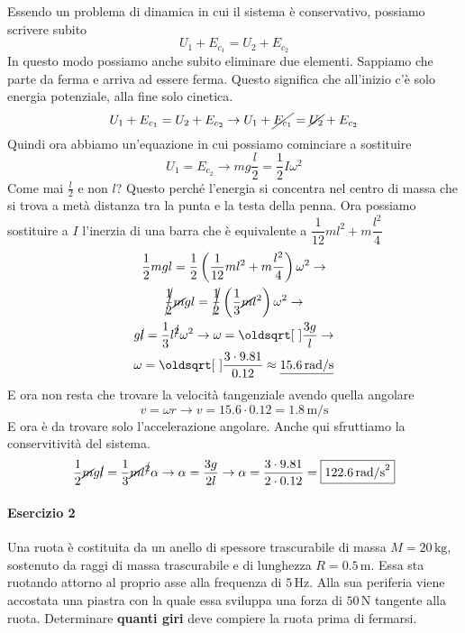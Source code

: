 Essendo un problema di dinamica in cui il sistema è conservativo, possiamo scrivere subito
\begin{equation*}
  U_1 + E_{c_1} = U_2 + E_{c_2}
\end{equation*}
In questo modo possiamo anche subito eliminare due elementi. Sappiamo che parte da ferma e arriva ad
essere ferma. Questo significa che all'inizio c'è solo energia potenziale, alla fine solo cinetica.
\begin{equation*}
  U_1 + E_{c_1} = U_2 + E_{c_2} \rightarrow U_1 + \cancel{E_{c_1}} = \cancel{U_2} + E_{c_2}
\end{equation*}
Quindi ora abbiamo un'equazione in cui possiamo cominciare a sostituire
\begin{equation*}
  U_1 = E_{c_2} \rightarrow mg\frac{l}{2} = \frac{1}{2}I\omega^2
\end{equation*}
Come mai $\frac{l}{2}$ e non $l$? Questo perché l'energia si concentra nel centro di massa che si 
trova a metà distanza tra la punta e la testa della penna. Ora possiamo sostituire a $I$ l'inerzia
di una barra che è equivalente a $\dfrac{1}{12}ml^2 + m\dfrac{l^2}{4}$
\begin{gather*}
  \frac{1}{2}mgl = \frac{1}{2}\left(\frac{1}{12}ml^2 + m\frac{l^2}{4}\right)\omega^2 \rightarrow\\
  \cancel{\frac{1}{2}}\cancel{m}gl = \cancel{\frac{1}{2}}\left(\frac{1}{3}\cancel{m}l^2\right)\omega^2 
  \rightarrow\\
  g\cancel{l} = \frac{1}{3}l^{\cancel{2}}\omega^2 \rightarrow \omega = \sqrt{\frac{3g}{l}} \rightarrow\\
  \omega = \sqrt{\frac{3\cdot9.81}{0.12}} \approx \underline{15.6\,\text{rad/s}}
\end{gather*}
E ora non resta che trovare la velocità tangenziale avendo quella angolare
\begin{equation*}
  v = \omega r \rightarrow v = 15.6\cdot0.12 = \boxed{1.8\,\text{m/s}}
\end{equation*}
E ora è da trovare solo l'accelerazione angolare. Anche qui sfruttiamo la conservitività del sistema.
\begin{equation*}
  \frac{1}{2}\cancel{m}g\cancel{l} = \frac{1}{3}\cancel{m}l^{\cancel{2}}\alpha \rightarrow
  \alpha = \frac{3g}{2l} \rightarrow \alpha = \frac{3\cdot9.81}{2\cdot0.12} = 
  \boxed{122.6\,\text{rad/s}^2}
\end{equation*}

\paragraph{Esercizio 2}
Una ruota è costituita da un anello di spessore trascurabile di massa $M=20\,\text{kg}$, sostenuto da 
raggi di massa trascurabile e di lunghezza $R = 0.5\,\text{m}$. Essa sta ruotando attorno al proprio
asse alla frequenza di $5\,\text{Hz}$. Alla sua periferia viene accostata una piastra con la quale 
essa sviluppa una forza di $50\,\text{N}$ tangente alla ruota. Determinare \textbf{quanti giri} deve 
compiere la ruota prima di fermarsi.
\divisor

